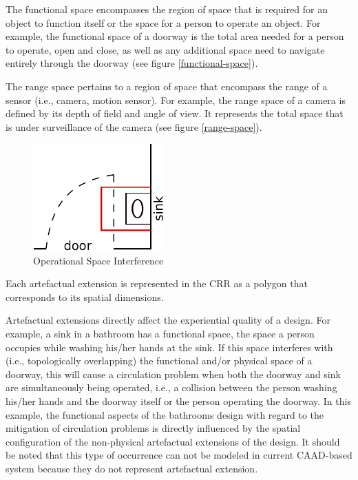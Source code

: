\documentclass[12pt]{ucthesis}
\begin{document}
The functional space encompasses the region of space that is required for an object to function itself or the space for a person to operate an object. For example, the functional space of a doorway is the total area needed for a person to operate, open and close, as well as any additional space need to navigate entirely through the doorway (see figure \ref{functional-space}). 

The range space pertains to a region of space that encompass the range of a sensor (i.e., camera, motion sensor). For example, the range space of a camera is defined by its depth of field and angle of view. It represents the total space that is under surveillance of the camera (see figure \ref{range-space}).

\begin{figure}[H]
\centering
\includegraphics[width=50mm]{door-sink}
\caption{Operational Space Interference}
\label{door-sink}
\end{figure}

Each artefactual extension is represented in the CRR as a polygon that corresponds to its spatial dimensions.

Artefactual extensions directly affect the experiential quality of a design. For example, a sink in a bathroom has a functional space, the space a person occupies while washing his/her hands at the sink. If this space interferes with (i.e., topologically overlapping) the functional and/or physical space of a doorway, this will cause a circulation problem when both the doorway and sink are simultaneously being operated, i.e., a collision between the person washing his/her hands and the doorway itself or the person operating the doorway. In this example, the functional aspects of the bathrooms design with regard to the mitigation of circulation problems is directly influenced by the spatial configuration of the non-physical artefactual extensions of the design. It should be noted that this type of occurrence can not be modeled in current CAAD-based system because they do not represent artefactual extension.
\end{document}
